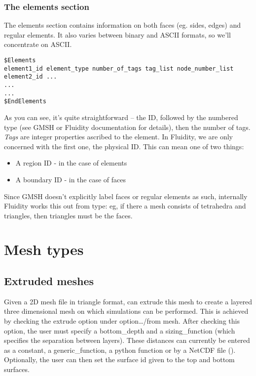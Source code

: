 \subsubsection*{The elements section}\label{sect:gmsh_elements_section}

The elements section contains information on both faces (eg. sides, edges) and regular elements. It also varies between binary and ASCII formats, so we'll concentrate on ASCII. 

\begin{lstlisting}
$Elements
element1_id element_type number_of_tags tag_list node_number_list
element2_id ...
...
...
$EndElements
\end{lstlisting}
As you can see, it's quite straightforward -- the ID, followed by the numbered type (see GMSH or Fluidity documentation for details), then the number of tags. \textit{Tags} are integer properties ascribed to the element. In Fluidity, we are only concerned with the first one, the physical ID. This can mean one of two things:


\begin{itemize}
\item A region ID - in the case of elements
\item A boundary ID - in the case of faces
\end{itemize}

Since GMSH doesn't explicitly label faces or regular elements as such, internally Fluidity works this out from type: eg, if there a mesh consists of tetrahedra and triangles, then triangles must be the faces.

\section{Mesh types}
\subsection{Extruded meshes}
\label{sect:extruded_meshes}

Given a 2D mesh file in triangle format, \fluidity can extrude this mesh to create a layered three dimensional mesh 
on which simulations can be performed. This is achieved by checking the extrude option under 
option{\ldots/from mesh}. After checking this option, the user must specify a bottom\_depth and 
a sizing\_function (which specifies the separation between layers). These distances can 
currently be entered as a constant, a generic\_function, a python function or by a NetCDF 
file (\website). Optionally, the user can then set the surface id given to the top and bottom surfaces. 

